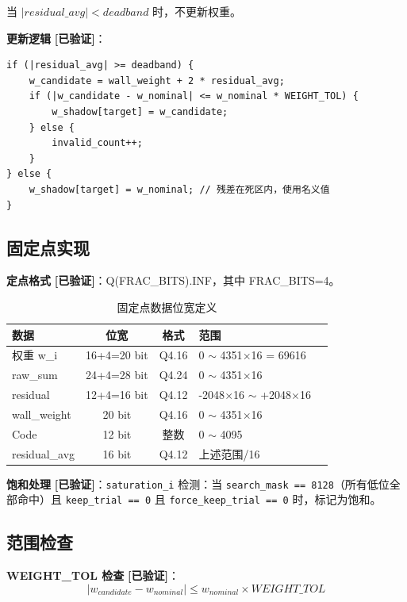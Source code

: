 \documentclass[UTF8,a4paper,11pt]{ctexart}
\newcommand{\verified}{\textcolor{verifiedgreen}{\textbf{[已验证]}}}
\begin{document}
当 $|residual\_avg| < deadband$ 时，不更新权重。

\textbf{更新逻辑} \verified：

\begin{lstlisting}[style=textstyle]
if (|residual_avg| >= deadband) {
    w_candidate = wall_weight + 2 * residual_avg;
    if (|w_candidate - w_nominal| <= w_nominal * WEIGHT_TOL) {
        w_shadow[target] = w_candidate;
    } else {
        invalid_count++;
    }
} else {
    w_shadow[target] = w_nominal; // 残差在死区内，使用名义值
}
\end{lstlisting}

\subsection{固定点实现}

\textbf{定点格式} \verified：Q(FRAC\_BITS).INF，其中 FRAC\_BITS=4。

\begin{table}[H]
\centering
\caption{固定点数据位宽定义}
\label{tab:fixedpoint}
\begin{tabular}{lccll}
\toprule
数据 & 位宽 & 格式 & 范围 \\
\midrule
权重 w\_i       & 16+4=20 bit & Q4.16 & 0 $\sim$ 4351$\times$16 = 69616 \\
raw\_sum        & 24+4=28 bit & Q4.24 & 0 $\sim$ 4351$\times$16 \\
residual        & 12+4=16 bit & Q4.12 & -2048$\times$16 $\sim$ +2048$\times$16 \\
wall\_weight    & 20 bit      & Q4.16 & 0 $\sim$ 4351$\times$16 \\
Code            & 12 bit      & 整数  & 0 $\sim$ 4095 \\
residual\_avg   & 16 bit      & Q4.12 & 上述范围/16 \\
\bottomrule
\end{tabular}
\end{table}

\textbf{饱和处理} \verified：\texttt{saturation\_i} 检测：当 \texttt{search\_mask == 8128}（所有低位全部命中）且 \texttt{keep\_trial == 0} 且 \texttt{force\_keep\_trial == 0} 时，标记为饱和。

\subsection{范围检查}

\textbf{WEIGHT\_TOL 检查} \verified：
\begin{equation}
|w_{candidate} - w_{nominal}| \leq w_{nominal} \times WEIGHT\_TOL
\label{eq:weight-tol}
\end{equation}
\end{document}
